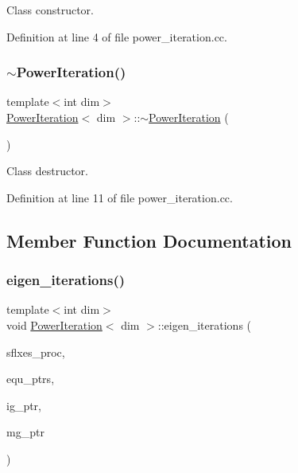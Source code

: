 Class constructor. 



Definition at line 4 of file power\+\_\+iteration.\+cc.

\mbox{\label{class_power_iteration_ad660a351afc4f23b1bcf7b334ef033dd}} 
\subsubsection{\texorpdfstring{$\sim$\+Power\+Iteration()}{~PowerIteration()}}
{\footnotesize\ttfamily template$<$int dim$>$ \\
\hyperlink{class_power_iteration}{Power\+Iteration}$<$ dim $>$\+::$\sim$\hyperlink{class_power_iteration}{Power\+Iteration} (\begin{DoxyParamCaption}{ }\end{DoxyParamCaption})}



Class destructor. 



Definition at line 11 of file power\+\_\+iteration.\+cc.



\subsection{Member Function Documentation}
\mbox{\label{class_power_iteration_a583586002126f8b7a523e95327047cba}} 
\subsubsection{\texorpdfstring{eigen\+\_\+iterations()}{eigen\_iterations()}}
{\footnotesize\ttfamily template$<$int dim$>$ \\
void \hyperlink{class_power_iteration}{Power\+Iteration}$<$ dim $>$\+::eigen\+\_\+iterations (\begin{DoxyParamCaption}\item[{std\+::vector$<$ Vector$<$ double $>$ $>$ \&}]{sflxes\+\_\+proc,  }\item[{std\+::vector$<$ std\+\_\+cxx11\+::shared\+\_\+ptr$<$ \hyperlink{class_equation_base}{Equation\+Base}$<$ dim $>$ $>$ $>$ \&}]{equ\+\_\+ptrs,  }\item[{std\+\_\+cxx11\+::shared\+\_\+ptr$<$ \hyperlink{class_i_g_base}{I\+G\+Base}$<$ dim $>$ $>$}]{ig\+\_\+ptr,  }\item[{std\+\_\+cxx11\+::shared\+\_\+ptr$<$ \hyperlink{class_m_g_base}{M\+G\+Base}$<$ dim $>$ $>$}]{mg\+\_\+ptr }\end{DoxyParamCaption})\hspace{0.3cm}{\ttfamily [virtual]}}

